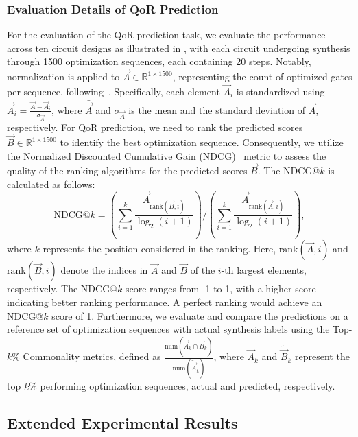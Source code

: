 \subsubsection{Evaluation Details of QoR Prediction}
\label{sec:qor_metric}	

For the evaluation of the QoR prediction task, we evaluate the performance across ten circuit designs as illustrated in , with each circuit undergoing synthesis through 1500 optimization sequences, each containing 20 steps.
Notably, normalization is applied to $\Vec{A} \in \mathbb{R}^{1\times1500}$, representing the count of optimized gates per sequence, following~\citep{chowdhury2021openabcd}.
Specifically, each element $\Vec{A}_{i}$ is standardized using $\Vec{A}_{i} = \frac{\bar{\Vec{A}}-\Vec{A}_{i}}{\sigma_{\Vec{A}}}$, where $\bar{\Vec{A}}$ and $\sigma_{\Vec{A}}$ is the mean and the standard deviation of $\Vec{A}$, respectively.
For QoR prediction, we need to rank the predicted scores $\Vec{B} \in \mathbb{R}^{1\times1500}$ to identify the best optimization sequence.
Consequently, we utilize the Normalized Discounted Cumulative Gain (NDCG)~\citep{jarvelin2017ireval, jarvelin2002cg} metric to assess the quality of the ranking algorithms for the predicted scores $\Vec{B}$.
The NDCG@$k$ is calculated as follows:
\begin{equation} 
    \text{NDCG}@k = (\sum_{i=1}^k \frac{\Vec{A}_{\text{rank}(\Vec{B}, {i})}}{\log_2(i + 1)}) / (\sum_{i=1}^{k} \frac{\Vec{A}_{\text{rank}(\Vec{A}, {i})}}{\log_2(i + 1)}),
\end{equation}
where $k$ represents the position considered in the ranking. 
Here, $\text{rank}(\Vec{A}, i)$ and $\text{rank}(\Vec{B}, i)$ denote the indices in $\Vec{A}$ and $\Vec{B}$ of the $i$-th largest elements, respectively. 
The NDCG@$k$ score ranges from -1 to 1, with a higher score indicating better ranking performance.
A perfect ranking would achieve an NDCG@$k$ score of 1.
Furthermore, we evaluate and compare the predictions on a reference set of optimization sequences with actual synthesis labels using the Top-$k$\% Commonality metrics, defined as $\frac{\text{num}(\tilde{\Vec{A}}_{k} \cap \tilde{\Vec{B}}_{k})}{\text{num}(\tilde{\Vec{A}}_{k})}$, where $\tilde{\Vec{A}}_{k}$ and $\tilde{\Vec{B}}_{k}$ represent the top $k$\% performing optimization sequences, actual and predicted, respectively.


\subsection{Extended Experimental Results}
\label{sec:ext_exp}

